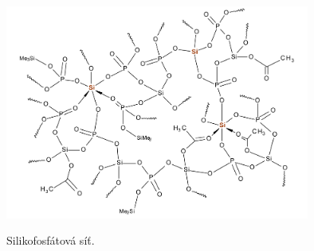 \documentclass[
  digital, %
  table,   %
  lof,     %
  lot,     %
]{fithesis3}
\begin{document}
\begin{otherlanguage}{czech}

\begin{figure}[h!]
\caption{Silikofosfátová síť. \cite{Styskalik2015thesis} }
  \center
  \includegraphics[width=10cm]{si_polymer_cely.png}
  \label{si_polymer_cely}
  \end{figure}



\end{otherlanguage}
\end{document}
